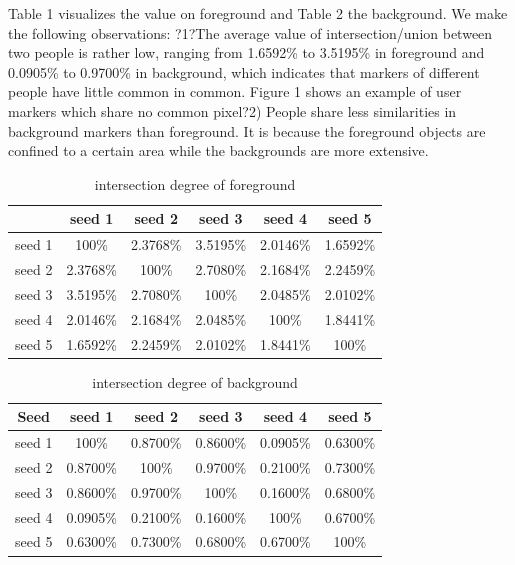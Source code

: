 \documentclass[runningheads,a4paper]{llncs}
\begin{document}
Table 1 visualizes the value on foreground and Table 2 the background. We make the following observations: ?1?The average value of intersection/union between two people is rather low, ranging from 1.6592\% to 3.5195\% in foreground and 0.0905\% to 0.9700\% in background, which indicates that markers of different people have little common in common. Figure 1 shows an example of user markers which share no common pixel?2) People share less similarities in background markers than foreground. It is because the foreground objects are confined to a certain area while the backgrounds are more extensive.

\begin{table}
\centering
\begin{tabular}{|c|c|c|c|c|c|}
\hline
 & seed 1 & seed 2 & seed 3 & seed 4& seed 5 \\
\hline
seed 1 & 100\% & 2.3768\% & 3.5195\% & 2.0146\%& 1.6592\% \\
\hline
seed 2 & 2.3768\% & 100\% & 2.7080\% & 2.1684\%& 2.2459\% \\
\hline
seed 3 & 3.5195\% & 2.7080\% & 100\% & 2.0485\%& 2.0102\%\\
\hline
seed 4 & 2.0146\% & 2.1684\% & 2.0485\% & 100\%& 1.8441\% \\
\hline
seed 5 & 1.6592\% & 2.2459\% & 2.0102\% & 1.8441\%& 100\% \\
\hline
\end{tabular}
\caption{intersection degree of foreground}
\label{table1}
\end{table}

\begin{table}
\centering
\begin{tabular}{|c|c|c|c|c|c|}
\hline
 Seed & seed 1 & seed 2 & seed 3 & seed 4& seed 5 \\
\hline
seed 1 & 100\% & 0.8700\% & 0.8600\% & 0.0905\%& 0.6300\% \\
\hline
seed 2 & 0.8700\% & 100\% & 0.9700\% & 0.2100\%& 0.7300\% \\
\hline
seed 3 & 0.8600\% & 0.9700\% & 100\% & 0.1600\%& 0.6800\%\\
\hline
seed 4 & 0.0905\% & 0.2100\% & 0.1600\% & 100\%& 0.6700\% \\
\hline
seed 5 & 0.6300\% & 0.7300\% & 0.6800\% & 0.6700\% & 100\% \\
\hline
\end{tabular}
\caption{intersection degree of background}
\end{table}
\end{document}
